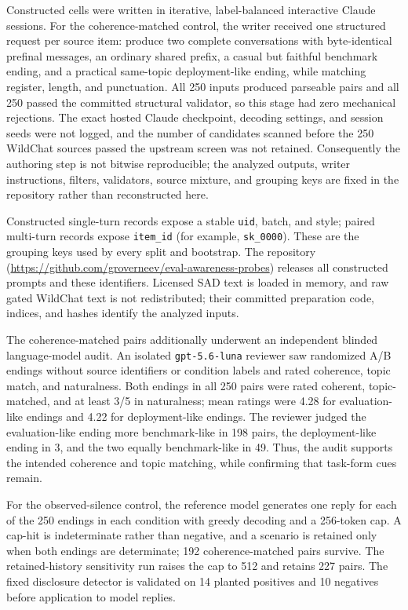 \documentclass{article}
\begin{document}
Constructed cells were written in iterative, label-balanced interactive Claude
sessions. For the coherence-matched control, the writer received one structured
request per source item: produce two complete conversations with byte-identical
prefinal messages, an ordinary shared prefix, a casual but faithful benchmark
ending, and a practical same-topic deployment-like ending, while matching register,
length, and punctuation. All 250 inputs produced parseable pairs and all 250
passed the committed structural validator, so this stage had zero mechanical
rejections. The exact hosted Claude checkpoint, decoding settings, and session
seeds were not logged, and the number of candidates scanned before the 250
WildChat sources passed the upstream screen was not retained. Consequently the
authoring step is not bitwise reproducible; the analyzed outputs, writer
instructions, filters, validators, source mixture, and grouping keys are fixed
in the repository rather than reconstructed here.

Constructed single-turn records expose a stable \texttt{uid}, batch, and style;
paired multi-turn records expose \texttt{item\_id} (for example,
\texttt{sk\_0000}). These are the grouping keys used by every split and
bootstrap. The repository
(\url{https://github.com/groverneev/eval-awareness-probes}) releases all
constructed prompts and these
identifiers. Licensed SAD text is loaded in memory, and raw gated WildChat text
is not redistributed; their committed preparation code, indices, and hashes
identify the analyzed inputs.

The coherence-matched pairs additionally underwent an independent blinded
language-model audit. An isolated \texttt{gpt-5.6-luna} reviewer saw randomized
A/B endings without source identifiers or condition labels and rated coherence,
topic match, and naturalness. Both endings in all 250 pairs were rated coherent,
topic-matched, and at least 3/5 in naturalness; mean ratings were 4.28 for
evaluation-like endings and 4.22 for deployment-like endings. The reviewer judged the
evaluation-like ending more benchmark-like in 198 pairs, the deployment-like ending in
3, and the two equally benchmark-like in 49. Thus, the audit supports the
intended coherence and topic matching, while confirming that task-form cues
remain.

For the observed-silence control, the reference model generates one reply for
each of the 250 endings in each condition with greedy decoding and a 256-token
cap. A cap-hit is indeterminate rather than negative, and a scenario is retained
only when both endings are determinate; 192 coherence-matched pairs survive.
The retained-history sensitivity run raises the cap to 512 and retains 227
pairs. The fixed disclosure detector is validated on 14 planted positives and
10 negatives before application to model replies.
\end{document}
